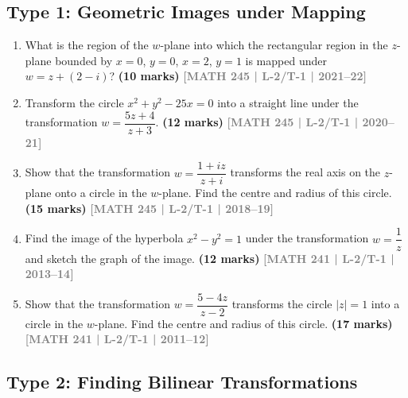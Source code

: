 \documentclass[12pt,a3paper]{article}
\newcommand{\yr}[1]{\hfill\textcolor{gray}{\small\textbf{[#1]}}}
\newcommand{\mk}[1]{\textcolor{orange!70!black}{\small\textbf{(#1 marks)}}}
\begin{document}
\subsection*{Type 1: Geometric Images under Mapping}

\begin{enumerate}

\item What is the region of the $w$-plane into which the rectangular region in the $z$-plane bounded by $x=0$, $y=0$, $x=2$, $y=1$ is mapped under $w=z+(2-i)$?
\mk{10} \yr{MATH 245 | L-2/T-1 | 2021--22}


\item Transform the circle $x^{2}+y^{2}-25x=0$ into a straight line under the transformation $w=\dfrac{5z+4}{z+3}$.
\mk{12} \yr{MATH 245 | L-2/T-1 | 2020--21}

  
\item Show that the transformation $w=\dfrac{1+iz}{z+i}$ transforms the real axis on the $z$-plane onto a circle in the $w$-plane. Find the centre and radius of this circle.
\mk{15} \yr{MATH 245 | L-2/T-1 | 2018--19}


\item Find the image of the hyperbola $x^{2}-y^{2}=1$ under the transformation $w=\dfrac{1}{z}$ and sketch the graph of the image.
\mk{12} \yr{MATH 241 | L-2/T-1 | 2013--14}


\item Show that the transformation $w=\dfrac{5-4z}{z-2}$ transforms the circle $|z|=1$ into a circle in the $w$-plane. Find the centre and radius of this circle.
\mk{17} \yr{MATH 241 | L-2/T-1 | 2011--12}


\end{enumerate}


\subsection*{Type 2: Finding Bilinear Transformations}
\end{document}
